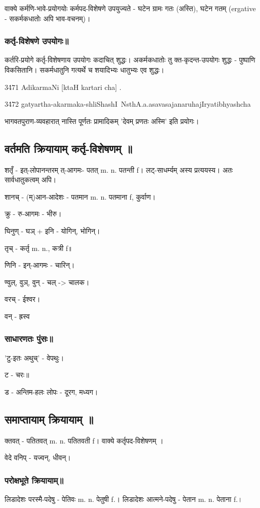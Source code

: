 \documentclass[oneside, article]{memoir}
\begin{document}
वाक्ये कर्मणि-भावे-प्रयोगयोः कर्मपद-विशेषणे उपयुज्यते - घटेन ग्रामः गतः (अस्ति), घटेन गतम् (ergative - सकर्मकधातोः अपि भाव-वचनम्)। 

\subsubsection{कर्तृ-विशेषणे उपयोगः॥}
कर्तरि-प्रयोगे कर्तृ-विशेषणाय उपयोगः कदाचित् शुद्धः। अकर्मकधातोः तु क्त-कृदन्त-उपयोगः शुद्धः - पुष्पाणि विकसितानि। सकर्मधातुनि गत्यर्थे च शयादिभ्यः धातुभ्यः एव शुद्धः। 

3\.4\.71 AdikarmaNi [ktaH kartari cha] .

3\.4\.72
gatyartha-akarmaka-shliShashI~NsthA.a.asavasajanaruhajIryatibhyashcha

भागवतपुराण-व्यवहारात् नास्ति पूर्णतः प्रामादिकम् 'देवम् प्रणतः अस्मि' इति प्रयोगः।

\subsection{वर्तमति क्रियायाम् कर्तृ-विशेषणम् ॥}
शतृँ - इत्-लोपानन्तरम् त्-आगमः- पतत् m. n. पतन्ती f।  लट्-साधर्म्यम् अस्य प्रत्ययस्य। अतः सार्वधातुकत्वम् अपि।

शानच् - (म्)आन-आदेशः - पतमान m. n. पतमाना f, कुर्वाण।

क्रु - रु-आगमः - भीरु।

घिनुण् - घञ् + इनि - योगिन्, भोगिन्।

तृच् - कर्तृ m. n., कत्री f॥

णिनि - इन्-आगमः - चारिन्।

ण्वुल्, वुञ्, वुन् - चल् -> चालक।

वरच् - ईश्वर।

वन् - ह्रस्व

\subsubsection{साधारणतः पुंसः॥}
'टु-इतः अथुच्' - वेपथुः।

ट - चरः॥

ड - अन्तिम-हलः लोपः - दूरग, मध्यग।

\subsection{समाप्तायाम् क्रियायाम् ॥}
क्तवत् - पतितवत् m. n. पतितवती f। वाक्ये कर्तृपद-विशेषणम् ।

वेदे वनिप् - यज्वन्, धीवन्।

\subsubsection{परोक्षभूते क्रियायाम्॥}
लिडादेशः परस्मै-पदेषु - पेतिवः m. n. पेतुषी f.। लिडादेशः आत्मने-पदेषु - पेतान m. n. पेताना f.।
\end{document}
